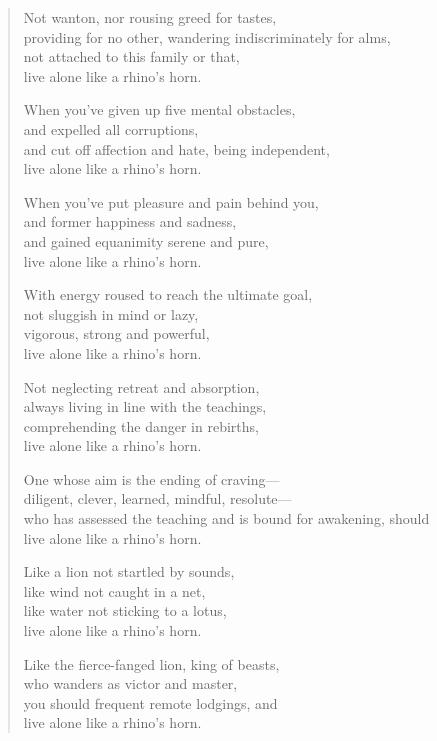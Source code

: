\documentclass[12pt,openany]{book}%
\begin{document}
\begin{verse}
Not wanton, nor rousing greed for tastes, \\
providing for no other, wandering indiscriminately for alms, \\
not attached to this family or that, \\
live alone like a rhino’s horn. 

When you’ve given up five mental obstacles, \\
and expelled all corruptions, \\
and cut off affection and hate, being independent, \\
live alone like a rhino’s horn. 

When you’ve put pleasure and pain behind you, \\
and former happiness and sadness, \\
and gained equanimity serene and pure, \\
live alone like a rhino’s horn. 

With energy roused to reach the ultimate goal, \\
not sluggish in mind or lazy, \\
vigorous, strong and powerful, \\
live alone like a rhino’s horn. 

Not neglecting retreat and absorption, \\
always living in line with the teachings, \\
comprehending the danger in rebirths, \\
live alone like a rhino’s horn. 

One whose aim is the ending of craving—\\
diligent, clever, learned, mindful, resolute—\\
who has assessed the teaching and is bound for awakening, should \\
live alone like a rhino’s horn. 

Like a lion not startled by sounds, \\
like wind not caught in a net, \\
like water not sticking to a lotus, \\
live alone like a rhino’s horn. 

Like the fierce-fanged lion, king of beasts, \\
who wanders as victor and master, \\
you should frequent remote lodgings, and \\
live alone like a rhino’s horn. 


\end{verse}
\end{document}
